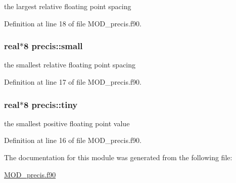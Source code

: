 the largest relative floating point spacing 



Definition at line 18 of file M\-O\-D\-\_\-precis.\-f90.

\hypertarget{classprecis_add2dd4c8ce112246ec177d911dadabfd}{
\subsubsection[{small}]{\setlength{\rightskip}{0pt plus 5cm}real$\ast$8 precis\-::small}}\label{classprecis_add2dd4c8ce112246ec177d911dadabfd}


the smallest relative floating point spacing 



Definition at line 17 of file M\-O\-D\-\_\-precis.\-f90.

\hypertarget{classprecis_a316560daad6a1f214299dbec5e6005e9}{
\subsubsection[{tiny}]{\setlength{\rightskip}{0pt plus 5cm}real$\ast$8 precis\-::tiny}}\label{classprecis_a316560daad6a1f214299dbec5e6005e9}


the smallest positive floating point value 



Definition at line 16 of file M\-O\-D\-\_\-precis.\-f90.



The documentation for this module was generated from the following file\-:\begin{DoxyCompactItemize}
\item 
\hyperlink{MOD__precis_8f90}{M\-O\-D\-\_\-precis.\-f90}\end{DoxyCompactItemize}

